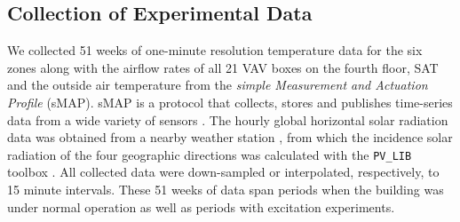 

\subsection{Collection of Experimental Data}\label{sec:exp_data}
We collected 51 weeks of one-minute resolution temperature data for the six zones along with the airflow rates of all 21 VAV boxes on the fourth floor, SAT and the outside air temperature from the \textit{simple Measurement and Actuation Profile} (sMAP). sMAP is a protocol that collects, stores and publishes time-series data from a wide variety of sensors \cite{smap, Dawson-Haggerty:2012aa}. The hourly global horizontal solar radiation data was obtained from a nearby weather station \cite{SolarRad}, from which the incidence solar radiation of the four geographic directions was calculated with the \texttt{PV\_LIB} toolbox \cite{pv_model}. All collected data were down-sampled or interpolated, respectively, to 15 minute intervals. 
These 51 weeks of data span periods when the building was under normal operation as well as periods with excitation experiments. 

